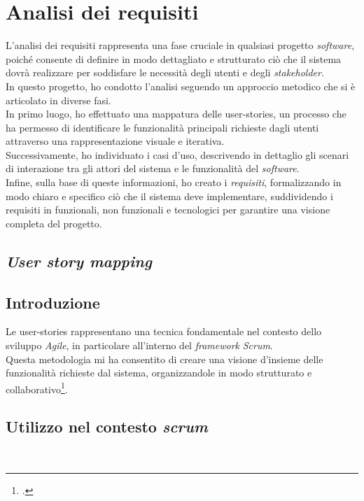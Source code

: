 \pagebreak
\section{Analisi dei requisiti}
\label{sez:analisi-dei-requisiti}
L’analisi dei requisiti rappresenta una fase cruciale in qualsiasi progetto \textit{software}, poiché consente di definire in modo dettagliato e strutturato ciò che il sistema dovrà realizzare per soddisfare le necessità degli utenti e degli \textit{stakeholder}.\\
In questo progetto, ho condotto l’analisi seguendo un approccio metodico che si è articolato in diverse fasi.\\

\noindent In primo luogo, ho effettuato una mappatura delle \gls{user-stories}, un processo che ha permesso di identificare le funzionalità principali richieste dagli utenti attraverso una rappresentazione visuale e iterativa. \\
Successivamente, ho individuato i casi d’uso, descrivendo in dettaglio gli scenari di interazione tra gli attori del sistema e le funzionalità del \textit{software}.\\
Infine, sulla base di queste informazioni, ho creato i \textit{requisiti}, formalizzando in modo chiaro e specifico ciò che il sistema deve implementare, suddividendo i requisiti in funzionali, non funzionali e tecnologici per garantire una visione completa del progetto.
\subsection{\textit{User story mapping}}
\label{subsec:user-story-mapping}

\subsection*{Introduzione}
\label{subsubsec:introduzione}

Le \gls{user-stories} rappresentano una tecnica fondamentale nel contesto dello sviluppo \textit{Agile}, in particolare all'interno del \textit{framework} \textit{Scrum}. \\
Questa metodologia mi ha consentito di creare una visione d'insieme delle funzionalità richieste dal sistema, organizzandole in modo strutturato e collaborativo\footcite{site:user-stories}. \\

\subsection*{Utilizzo nel contesto \textit{scrum}}\\

